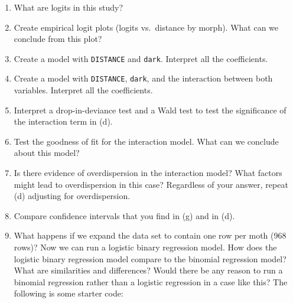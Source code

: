 \documentclass[
]{krantz}
\providecommand{\tightlist}{%
  \setlength{\itemsep}{0pt}\setlength{\parskip}{0pt}}
\begin{document}
\begin{enumerate}
\def\labelenumi{\alph{enumi}.}
\tightlist
\item
  What are logits in this study?
\item
  Create empirical logit plots (logits vs.~distance by morph). What can we conclude from this plot?
\item
  Create a model with \texttt{DISTANCE} and \texttt{dark}. Interpret all the coefficients.
\item
  Create a model with \texttt{DISTANCE}, \texttt{dark}, and the interaction between both variables. Interpret all the coefficients.
\item
  Interpret a drop-in-deviance test and a Wald test to test the significance of the interaction term in (d).
\item
  Test the goodness of fit for the interaction model. What can we conclude about this model?
\item
  Is there evidence of overdispersion in the interaction model? What factors might lead to overdispersion in this case? Regardless of your answer, repeat (d) adjusting for overdispersion.
\item
  Compare confidence intervals that you find in (g) and in (d).
\item
  What happens if we expand the data set to contain one row per moth (968 rows)? Now we can run a logistic binary regression model. How does the logistic binary regression model compare to the binomial regression model? What are similarities and differences? Would there be any reason to run a binomial regression rather than a logistic regression in a case like this? The following is some starter code:
\end{enumerate}
\end{document}
